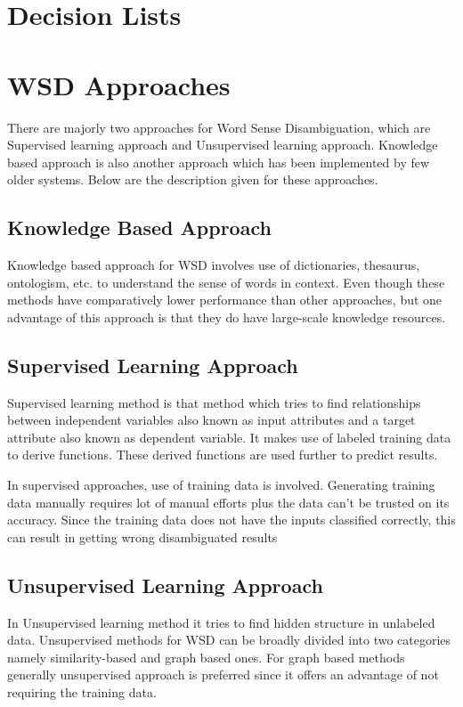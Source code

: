 \documentclass[article,dr=phil,type=drfinal,colorback,accentcolor=tud9c]{tudthesis}
\begin{document}
\section{Decision Lists}

\newpage
\section{WSD Approaches}
There are majorly two approaches for Word Sense Disambiguation, which
are Supervised learning approach and Unsupervised learning approach.
Knowledge based approach is also another approach which has been implemented
by few older systems. Below are the description given for these approaches.
\subsection{Knowledge Based Approach}
Knowledge based approach for WSD involves use of dictionaries,
thesaurus, ontologism, etc. to understand the sense of words in context. Even
though these methods have comparatively lower performance than other
approaches, but one advantage of this approach is that they do have large-scale
knowledge resources.

\subsection{Supervised Learning Approach}
Supervised learning method is that method which tries to find relationships
between independent variables also known as input attributes and a target
attribute also known as dependent variable. It makes use of labeled training data
to derive functions. These derived functions are used further to predict results.

In supervised approaches, use of training data is involved.
Generating training data manually requires lot of manual efforts plus the data
can’t be trusted on its accuracy. Since the training data does not have the inputs
classified correctly, this can result in getting wrong disambiguated results

\subsection{Unsupervised Learning Approach}
In Unsupervised learning method it tries to find hidden structure in
unlabeled data. Unsupervised methods for WSD can be broadly divided into two
categories namely similarity-based and graph based ones. For graph based
methods generally unsupervised approach is preferred since it offers an
advantage of not requiring the training data.
\end{document}

